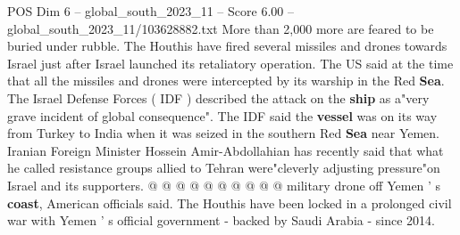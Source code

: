 \begin{textsample}{POS Dim 6 – global\_south\_2023\_11 – Score 6.00 – global\_south\_2023\_11/103628882.txt}
More than 2,000 more are feared to be buried under rubble.
The Houthis have fired several missiles and drones towards Israel just after Israel launched its retaliatory operation.
The US said at the time that all the missiles and drones were intercepted by its warship in the Red \textbf{Sea}.
The Israel Defense Forces ( IDF ) described the attack on the \textbf{ship} as a"very grave incident of global consequence".
The IDF said the \textbf{vessel} was on its way from Turkey to India when it was seized in the southern Red \textbf{Sea} near Yemen.
Iranian Foreign Minister Hossein Amir-Abdollahian has recently said that what he called resistance groups allied to Tehran were"cleverly adjusting pressure"on Israel and its supporters. @ @ @ @ @ @ @ @ @ @ military drone off Yemen ' s \textbf{coast}, American officials said.
The Houthis have been locked in a prolonged civil war with Yemen ' s official government - backed by Saudi Arabia - since 2014.

\end{textsample}
